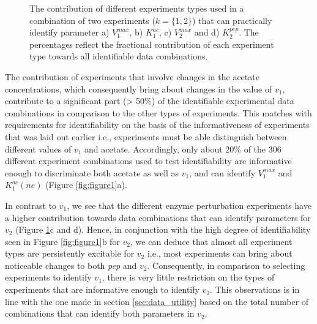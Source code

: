 \documentclass[10pt]{article}
\begin{document}
	\begin{figure}[!tbhp]
		\caption{The contribution of different experiments types used in a combination of two experiments ($k = \{1, 2\}$) that can practically identify parameter a) $V_1^{max}$, b) $K_1^{ac}$, c) $V_2^{max}$ and d) $K_2^{pep}$. The percentages reflect the fractional contribution of each experiment type towards all identifiable data combinations.}\label{fig:figure2}
	\end{figure} 
	
	The contribution of experiments that involve changes in the acetate concentrations, which consequently bring about changes in the value of $v_1$, contribute to a significant part (> 50\%) of the identifiable experimental data combinations in comparison to the other types of experiments. This matches with requirements for identifiability on the basis of the informativeness of experiments that was laid out earlier i.e., experiments must be able distinguish between different values of $v_1$ and acetate. Accordingly, only about 20\% of the 306 different experiment combinations used to test identifiability are informative enough to discriminate both acetate as well as $v_1$, and can identify $V_1^{max}$ and $K_1^{ac}(ne)$ (Figure \ref{fig:figure1}a). 	
	
	In contrast to $v_1$, we see that the different enzyme perturbation experiments have a higher contribution towards data combinations that can identify parameters for $v_2$ (Figure \ref{fig:figure2}c and d). Hence, in conjunction with the high degree of identifiability seen in Figure \ref{fig:figure1}b for $v_2$, we can deduce that almost all experiment types are persistently excitable for $v_2$ i.e., most experiments can bring about noticeable changes to both \textit{pep} and $v_2$. Consequently, in comparison to selecting experiments to identify $v_1$, there is very little restriction on the types of experiments that are informative enough to identify $v_2$. This observations is in line with the one made in section \ref{sec:data_utility} based on the total number of combinations that can identify both parameters in $v_2$.
	
\end{document}

